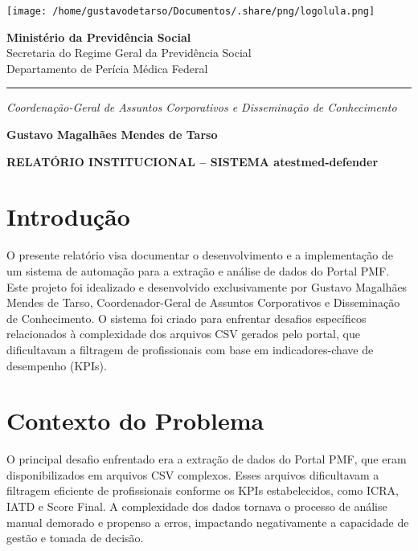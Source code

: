 \documentclass[11pt]{article}
\author{Gustavo M. Mendes de Tarso}
\date{\today}
\title{}
\begin{document}
\begin{center}
\texttt{[image: /home/gustavodetarso/Documentos/.share/png/logolula.png]}
\end{center}

\vspace{-1.8cm}
\begin{center}
\textbf{Ministério da Previdência Social}\\
Secretaria do Regime Geral da Previdência Social\\
Departamento de Perícia Médica Federal
\end{center}

\vspace{-0.3cm}
\hrule

\vspace{-0.3cm}
\begin{center}
\textit{Coordenação-Geral de Assuntos Corporativos e Disseminação de Conhecimento}
\end{center}

\vspace{-0.8cm}
\begin{center}
\textbf{Gustavo Magalhães Mendes de Tarso}
\end{center}

\vspace{1.5cm}

\textbf{RELATÓRIO INSTITUCIONAL – SISTEMA atestmed-defender}

\section{Introdução}
\label{sec:orgbb31495}

O presente relatório visa documentar o desenvolvimento e a implementação de um sistema de automação para a extração e análise de dados do Portal PMF. Este projeto foi idealizado e desenvolvido exclusivamente por Gustavo Magalhães Mendes de Tarso, Coordenador-Geral de Assuntos Corporativos e Disseminação de Conhecimento. O sistema foi criado para enfrentar desafios específicos relacionados à complexidade dos arquivos CSV gerados pelo portal, que dificultavam a filtragem de profissionais com base em indicadores-chave de desempenho (KPIs).

\section{Contexto do Problema}
\label{sec:org3b3a8e8}

O principal desafio enfrentado era a extração de dados do Portal PMF, que eram disponibilizados em arquivos CSV complexos. Esses arquivos dificultavam a filtragem eficiente de profissionais conforme os KPIs estabelecidos, como ICRA, IATD e Score Final. A complexidade dos dados tornava o processo de análise manual demorado e propenso a erros, impactando negativamente a capacidade de gestão e tomada de decisão.
\end{document}
